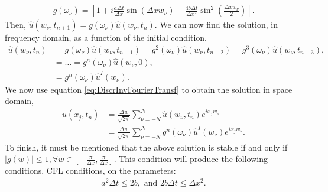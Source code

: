 \begin{questions}
\begin{solution}
\begin{align}
g(\omega_{\nu}) = \left[1+i\frac{a\Delta t}{ \Delta x}\sin\left(\Delta xw_{\nu}\right)-\frac{4b\Delta t}{\Delta x^2}\sin^2\left(\frac{\Delta xw_{\nu}}{2}\right)\right].
\end{align}
Then, $\hat{u}(w_{\nu}, t_{n+1}) = g(\omega_{\nu} )\hat{u}(w_{\nu}, t_n)$. We can now find the solution, in frequency domain, as a function of the initial condition.
\begin{align*}
\hat{u}(w_{\nu}, t_n) &= g(\omega_{\nu} )\hat{u}(w_{\nu}, t_{n-1})= g^2(\omega_{\nu} )\hat{u}(w_{\nu}, t_{n-2})= g^3(\omega_{\nu} )\hat{u}(w_{\nu}, t_{n-3}),\\
&= \dots = g^n(\omega_{\nu} )\hat{u}(w_{\nu}, 0),\\
&= g^n(\omega_{\nu} )\hat{u}^I(w_{\nu}).
\end{align*}
We now use equation \eqref{eq:DiscrInvFourierTransf} to obtain the solution in space domain,
\begin{align}
u(x_j,t_n)&=\frac{\Delta w}{\sqrt{2\pi}}\sum_{\nu=-N}^N \hat{u}(w_{\nu},t_n)e^{ix_jw_{\nu}}\nonumber\\
&= \frac{\Delta w}{\sqrt{2\pi}}\sum_{\nu=-N}^N g^n(\omega_{\nu} )\hat{u}^I(w_{\nu})e^{ix_jw_{\nu}}.
\end{align}
To finish, it must be mentioned that the above solution is stable if and only if $|g(w)|\leq 1, \forall w\in[-\frac{\pi}{\Delta x},\frac{\pi}{\Delta x}]$. This condition will produce the following conditions, CFL conditions, on the parameters:
\begin{align}\label{eq:CFL}
a^2\Delta t \leq 2b,\text{  and  }2b\Delta t\leq\Delta x^2.
\end{align}
\end{solution}
\end{questions}